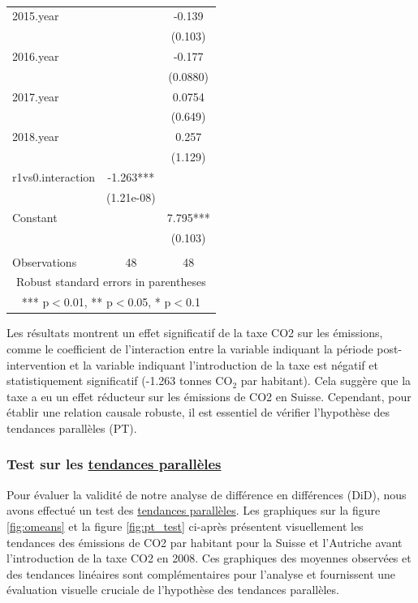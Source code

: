 \begin{table}[H]
{\begin{tabular}{lcc}
2015.year &  & -0.139 \\
 &  & (0.103) \\
2016.year &  & -0.177 \\
 &  & (0.0880) \\
2017.year &  & 0.0754 \\
 &  & (0.649) \\
2018.year &  & 0.257 \\
 &  & (1.129) \\
r1vs0.interaction & -1.263*** &  \\
 & (1.21e-08) &  \\
Constant &  & 7.795*** \\
 &  & (0.103) \\
 &  &  \\
 Observations & 48 & 48 \\ \hline
\multicolumn{3}{c}{ Robust standard errors in parentheses} \\
\multicolumn{3}{c}{ *** p$<$0.01, ** p$<$0.05, * p$<$0.1} \\
\end{tabular}
}
\caption{}
\label{tab:did_results_table}
\end{table}



Les résultats montrent un effet significatif de la taxe CO2 sur les émissions, comme le coefficient de l'interaction entre la variable indiquant la période post-intervention et la variable indiquant l'introduction de la taxe est négatif et statistiquement significatif (-1.263 tonnes CO$_2$ par habitant). Cela suggère que la taxe a eu un effet réducteur sur les émissions de CO2 en Suisse. Cependant, pour établir une relation causale robuste, il est essentiel de vérifier l'hypothèse des tendances parallèles (PT).


\subsubsection{Test sur les \hyperref[subsec:linear_trend_method]{tendances parallèles}}

\label{subsubsec:pt_test}

Pour évaluer la validité de notre analyse de différence en différences (DiD), nous avons effectué un test des \hyperref[subsec:linear_trend_method]{tendances parallèles}. Les graphiques sur la figure \ref{fig:omeans} et la figure \ref{fig:pt_test} ci-après présentent visuellement les tendances des émissions de CO2 par habitant pour la Suisse et l'Autriche avant l'introduction de la taxe CO2 en 2008. Ces graphiques des moyennes observées et des tendances linéaires sont complémentaires pour l'analyse et fournissent une évaluation visuelle cruciale de l'hypothèse des tendances parallèles.


